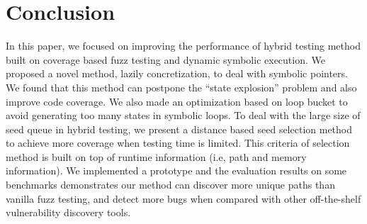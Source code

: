 \documentclass{cta-author}
\begin{document}
\section{Conclusion} \label{sec:conclusion}
In this paper, we focused on improving the performance of hybrid testing method built on coverage based fuzz testing and dynamic symbolic execution. We proposed a novel method, lazily concretization, to deal with symbolic pointers. We found that this method can postpone the ``state explosion'' problem and also improve code coverage. We also made an optimization based on loop bucket to avoid generating too many states in symbolic loops. To deal with the large size of seed queue in hybrid testing, we present a distance based seed selection method to achieve more coverage when testing time is limited. This criteria of selection method is built on top of runtime information (i.e, path and memory information). We implemented a prototype and the evaluation results on some benchmarks demonstrates our method can discover more unique paths than vanilla fuzz testing, and detect more bugs when compared with other off-the-shelf vulnerability discovery tools.
\end{document}
